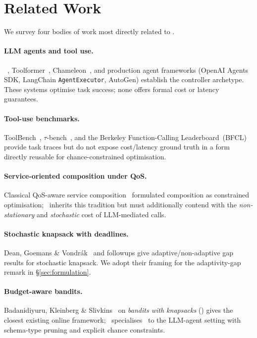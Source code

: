 \section{Related Work}
\label{sec:related}

We survey four bodies of work most directly related to \CBSLAO.

\paragraph{LLM agents and tool use.}
\ReAct~\cite{yao2023react}, Toolformer~\cite{schick2023toolformer},
Chameleon~\cite{lu2023chameleon}, and production agent frameworks
(OpenAI Agents SDK, LangChain \texttt{AgentExecutor}, AutoGen) establish
the controller archetype. These systems optimise task success; none
offers formal cost or latency guarantees.

\paragraph{Tool-use benchmarks.}
ToolBench~\cite{qin2023toolllm}, $\tau$-bench~\cite{yao2024taubench},
and the Berkeley Function-Calling
Leaderboard~(BFCL)~\cite{bfcl2024} provide task traces but do not
expose cost/latency ground truth in a form directly reusable for
chance-constrained optimisation.

\paragraph{Service-oriented composition under QoS.}
Classical QoS-aware service composition~\cite{zeng2004qos,alrifai2009qos}
formulated composition as constrained optimisation; \CBSLAO~inherits
this tradition but must additionally contend with the
\emph{non-stationary} and \emph{stochastic} cost of LLM-mediated
calls.

\paragraph{Stochastic knapsack with deadlines.}
Dean, Goemans \& Vondr\'{a}k~\cite{dean2008stochastic} and followups
give adaptive/non-adaptive gap results for stochastic knapsack. We
adopt their framing for the adaptivity-gap remark in
\S\ref{sec:formulation}.

\paragraph{Budget-aware bandits.}
Badanidiyuru, Kleinberg \& Slivkins~\cite{bwk2018} on
\emph{bandits with knapsacks} (\BwK) gives the closest existing online
framework; \CBUC~specialises \BwK~to the LLM-agent setting with
schema-type pruning and explicit chance constraints.

